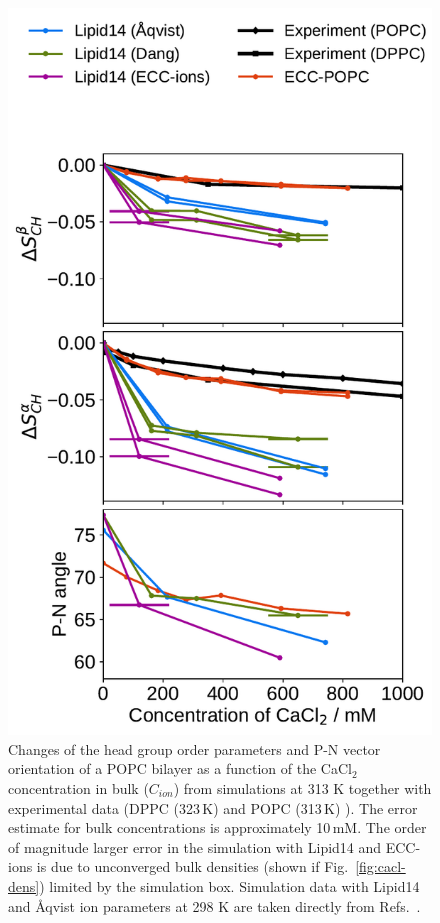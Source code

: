 \begin{figure}[htb!] 
  \centering 
  \includegraphics[width=\figwidth]{../img/ecc_popc/OrdPars-A-B-PNvec_L14-ECC-lipids_CaCl.pdf}
  \caption{\label{fig:delta_ordPar_CaCl} 
    Changes of the head group order parameters and P-N vector orientation of a POPC bilayer  
    as a function of the CaCl$_2$ concentration in bulk ($C_{ion}$) 
    from simulations at 313 K together with experimental data  
    (DPPC (323\,K) \citep{akutsu81} and POPC (313\,K) \citep{altenbach84}).  
    The error estimate for bulk concentrations is approximately 10\,mM. 
    The order of magnitude larger error in the
    simulation with Lipid14 and ECC-ions is due to unconverged bulk densities  (shown if Fig.~\ref{fig:cacl-dens}) limited by
    the simulation box.  
    Simulation data with Lipid14 and Åqvist ion parameters at 298 K are taken directly from 
    Refs.~\citep{lipid14POPC0mMNaClfiles,lipid14POPC350mMCaClfiles,lipid14POPC350mMCaClfilesNC}. 
  } 
\end{figure} 


